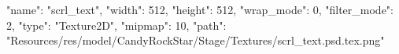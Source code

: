 {
  "name": "scrl_text",
  "width": 512,
  "height": 512,
  "wrap_mode": 0,
  "filter_mode": 2,
  "type": "Texture2D",
  "mipmap": 10,
  "path": "Resources/res/model/CandyRockStar/Stage/Textures/scrl_text.psd.tex.png"
}